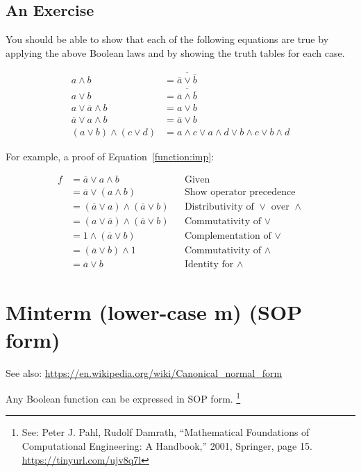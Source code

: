 \documentclass[10pt]{article}
\begin{document}
\subsection{An Exercise}
You should be able to show that each of the following equations are true
by applying the above Boolean laws and by showing the truth tables for
each case.


\begin{align}
a \land b &= \overline{\overline{a} \lor \overline{b}}		\\
a \lor b &= \overline{\overline{a} \land \overline{b}}		\\
a \lor \overline{a} \land b &= a \lor b						\\
\overline{a} \lor a \land b &= \overline{a} \lor b			\label{function:imp}\\
(a \lor b) \land (c \lor d) & = a \land c \lor a \land d \lor b \land c \lor b \land d
\end{align}

For example, a proof of Equation~\ref*{function:imp}:

\begin{align}
f &= \overline{a} \lor a \land b						&& \text{Given} \\
&= \overline{a} \lor ( a \land b )						&& \text{Show operator precedence} \\
&= (\overline{a} \lor a) \land (\overline{a} \lor b)	&& \text{Distributivity of $\lor$ over $\land$} \\
&= (a \lor \overline{a}) \land (\overline{a} \lor b)	&& \text{Commutativity of $\lor$} \\
&= 1 \land (\overline{a} \lor b)						&& \text{Complementation of $\lor$} \\
&= (\overline{a} \lor b) \land 1						&& \text{Commutativity of $\land$} \\
&= \overline{a} \lor b									&& \text{Identity for $\land$}
\end{align}



\section{Minterm (lower-case m) (SOP form)}

See also: \url{https://en.wikipedia.org/wiki/Canonical_normal_form}

Any Boolean function can be expressed in SOP form.
\footnote{See: Peter J. Pahl, Rudolf Damrath, ``Mathematical Foundations of Computational Engineering: A Handbook,'' 2001, Springer, page 15. \url{https://tinyurl.com/ujv8q7l} }
\end{document}
